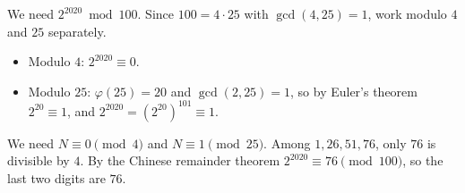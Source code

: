 We need \(2^{2020}\bmod 100\). Since \(100=4\cdot 25\) with \(\gcd(4,25)=1\), work modulo \(4\) and \(25\) separately.
\begin{itemize}
\item Modulo \(4\): \(2^{2020}\equiv 0\).
\item Modulo \(25\): \(\varphi(25)=20\) and \(\gcd(2,25)=1\), so by Euler's theorem \(2^{20}\equiv 1\), and \(2^{2020}=(2^{20})^{101}\equiv 1\).
\end{itemize}
We need \(N\equiv 0\pmod 4\) and \(N\equiv 1\pmod{25}\). Among \(1,26,51,76\), only \(76\) is divisible by \(4\). By the Chinese remainder theorem \(2^{2020}\equiv 76\pmod{100}\), so the last two digits are \(\boxed{76}\).
